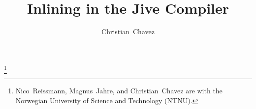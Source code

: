 \documentclass[a4paper]{article}
\begin{document}
\title{Inlining in the Jive Compiler}
\author{Christian~Chavez}
\maketitle
{}

\thanks{Nico~Reissmann, Magnus~Jahre, and Christian~Chavez are with the
Norwegian University of Science and Technology (NTNU).}

\vfill


\clearpage
\tableofcontents

\clearpage












\clearpage
\appendix
\addappheadtotoc

\end{document}
